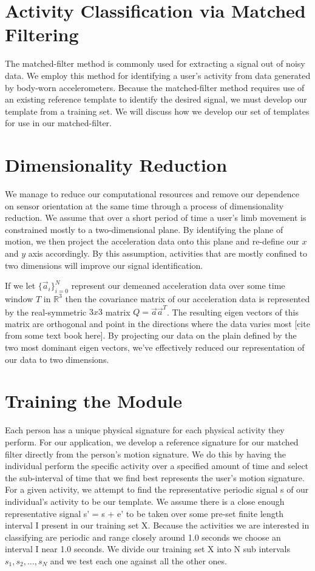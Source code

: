 \documentclass[journal]{IEEEtran}
\begin{document}
\section{Activity Classification via Matched Filtering}
The matched-filter method is commonly used for extracting a signal out of noisy data.  We employ this method for identifying a user’s activity from data generated by body-worn accelerometers.  Because the matched-filter method requires use of an existing reference template to identify the desired signal, we must develop our template from a training set. We will discuss how we develop our set of templates for use in our matched-filter.
%
\section{Dimensionality Reduction}
We manage to reduce our computational resources and remove our dependence on sensor orientation at the same time through a process of dimensionality reduction. We assume that over a short period of time a user’s limb movement is constrained mostly to a two-dimensional plane.  By identifying the plane of motion, we then project the acceleration data onto this plane and re-define our $x$ and $y$ axis accordingly. By this assumption, activities that are mostly confined to two dimensions will improve our signal identification.

If we let $\{\vec{a}_i\}_{i=0}^{N}$ represent our demeaned acceleration data over some time window $T$ in $\mathbb{R}^3$ then the covariance matrix of our acceleration data is represented by the real-symmetric $3x3$ matrix $Q = \vec{a} \vec{a}^T$. The resulting eigen vectors of this matrix are orthogonal and point in the directions where the data varies most [cite from some text book here]. By projecting our data on the plain defined by the two most dominant eigen vectors, we've effectively reduced our representation of our data to two dimensions.
%
\section{Training the Module}
Each person has a unique physical signature for each physical activity they perform.  For our application, we develop a reference signature for our matched filter directly from the person’s motion signature. We do this by having the individual perform the specific activity over a specified amount of time and select the sub-interval of time that we find best represents the user's motion signature. For a given activity, we attempt to find the representative periodic signal s of our individual’s activity to be our template. We assume there is a close enough representative signal s’ = s + e’ to be taken over some pre-set finite length interval I present in our training set X. Because the activities we are interested in classifying are periodic and range closely around 1.0 seconds we choose an interval I near 1.0 seconds. We divide our training set X into N sub intervals ${s_1, s_2, …, s_N}$ and we test each one against all the other ones.
%
\end{document}
